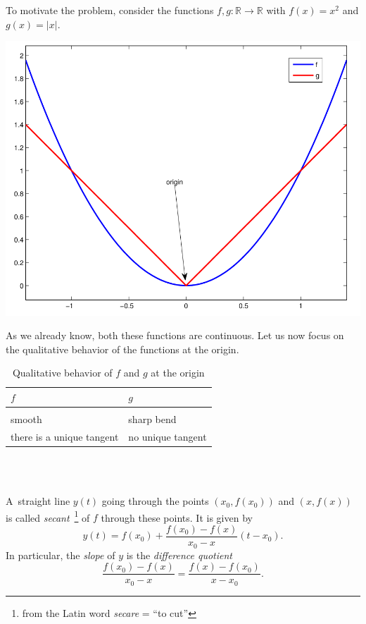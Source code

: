 

To motivate the problem, consider the functions $f,g:\mathbb{R}\to\mathbb{R}$ with $f(x)=x^2$ and $g(x)=|x|$.

\includegraphics{./dom.png}

As we already know, both these functions are continuous. Let us now focus on the qualitative behavior of the functions at the origin.
\renewcommand{\arraystretch}{1.5}
\begin{table}[h!]\begin{center}
\begin{tabular}{|l|l|}
\hline $f$&$g$\\
\hline\hline&\\[-0.7cm]
smooth& sharp bend\\\hline
there is a unique tangent& no unique tangent\\\hline
\end{tabular}~\\~\\\caption{Qualitative behavior of $f$ and $g$ at the origin}\label{tab:ewcf}\end{center}
\end{table}
\renewcommand{\arraystretch}{1}\newpage
A~straight line $y(t)$ going through the points $(x_0,f(x_0))$ and $(x,f(x))$ is called
\emph{secant}~\footnote{from the Latin word {\em secare} = ``to cut''}
 of $f$ through these points. It is given by
\[y(t)=f(x_0)+\frac{f(x_0)-f(x)}{x_0-x}(t-x_0) .\]
In particular, the \emph{slope} of $y$ is the \emph{difference quotient}
\[\frac{f(x_0)-f(x)}{x_0-x}=\frac{f(x)-f(x_0)}{x-x_0}.\]

